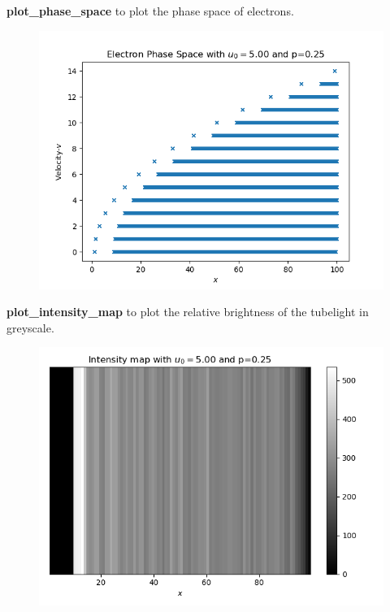 \documentclass[11pt, a4paper]{article}
\begin{document}
{\bf plot\_phase\_space} to plot the phase space of electrons.
 
   \begin{figure}[!tbh]
   	\centering
   	\includegraphics[scale=0.5]{fig2.png}  %

   	\label{fig:sample}
   \end{figure} 
  
  {\bf plot\_intensity\_map} to plot the relative brightness of the tubelight in greyscale.
 \begin{figure}[!tbh]
   	\centering
   	\includegraphics[scale=0.5]{fig3.png}  %

   	\label{fig:sample}
   \end{figure} 
   
\end{document}
